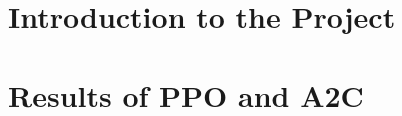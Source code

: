 \documentclass[a4paper,11pt,twoside]{report}
\begin{document}
	
	
	\tableofcontents
	\listoffigures
	\lstlistoflistings
	
	\chapter{Introduction to the Project}
	
	\chapter{Results of PPO and A2C}
	\label{chap:kef2}
	
	
\end{document}
